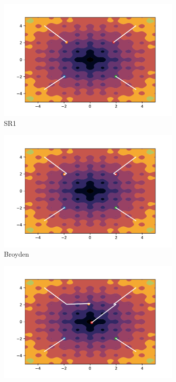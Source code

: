 \begin{figure}[h!]
    \begin{subfigure}{0.5\textwidth}
        \includegraphics[width=\textwidth, trim=1cm 0.5cm 1.3cm 1cm, clip]{assets/SR1/ackley.pdf}
        \caption{SR1}
    \end{subfigure}
    \begin{subfigure}{0.5\textwidth}
        \includegraphics[width=\textwidth, trim=1cm 0.5cm 1.3cm 1cm, clip]{assets/Broyden/ackley.pdf}
        \caption{Broyden}
    \end{subfigure}
    \begin{subfigure}{0.5\textwidth}
        \includegraphics[width=\textwidth, trim=1cm 0.5cm 1.3cm 1cm, clip]{assets/DFP/ackley.pdf}

\end{subfigure}
\end{figure}
